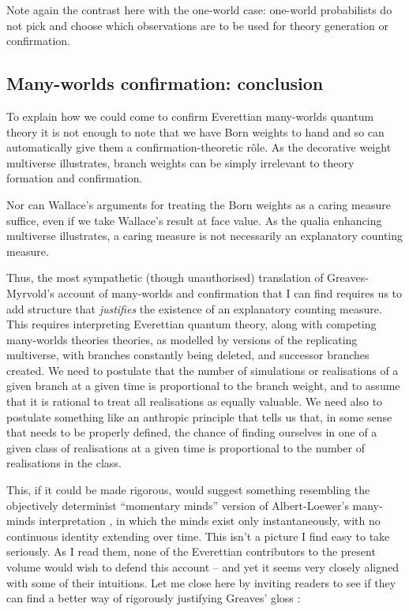 \documentclass[aps,
pra,epsfig,12pt]{revtex4}
\begin{document}
Note again the contrast here with the one-world case:
one-world probabilists do not pick and choose which observations 
are to be used for theory generation or confirmation.  

\subsection{Many-worlds confirmation: conclusion}

To explain how we could come to confirm Everettian many-worlds
quantum theory it is not enough to note that we have Born
weights to hand and so can automatically give them a 
confirmation-theoretic r\^{o}le.   As the decorative weight multiverse 
illustrates, branch weights can be simply irrelevant to 
theory formation and confirmation.   
  
Nor can Wallace's arguments for treating the 
Born weights as a caring measure suffice, even if we take Wallace's
result at face value.  As the qualia enhancing multiverse
illustrates, a caring measure is not necessarily an explanatory 
counting measure.  

Thus, the most sympathetic (though unauthorised) 
translation of Greaves-Myrvold's 
account of many-worlds and confirmation that I can find requires us
to add structure that {\it justifies} the existence of an 
explanatory counting measure.   This requires interpreting 
Everettian quantum theory, along with competing many-worlds theories
theories, as modelled by versions of the replicating multiverse,
with branches constantly being deleted, and successor branches
created.  We need to postulate that the number of 
simulations or realisations of a given branch at a given 
time is proportional to the branch weight, and to assume 
that it is rational to treat all realisations as equally valuable.
We need also to postulate something like an
anthropic principle that tells us that, in some sense that
needs to be properly defined, the chance of finding ourselves in 
one of a given class of realisations at a given time is proportional 
to the number of realisations in the class.  

This, if it could be made rigorous, would suggest something resembling 
the objectively determinist 
``momentary minds'' version of Albert-Loewer's many-minds 
interpretation \cite{almanyminds,bellmw,barbour}, 
in which the minds exist only instantaneously, with no continuous
identity extending over time.   This isn't a picture I find easy to take
seriously.    As I read them, none of the Everettian 
contributors to the present volume would 
wish to defend this account -- and yet it seems very closely aligned with 
some of their intuitions.  Let me close here by inviting 
readers to see if they can find a better
way of rigorously justifying Greaves' gloss \cite{greaves}:
\end{document}
